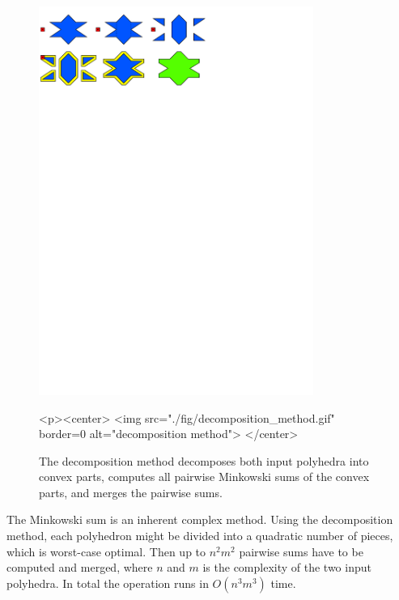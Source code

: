 \begin{figure}[t]
  \begin{ccTexOnly}
    \begin{center}
      \includegraphics[width=0.8\textwidth]{Minkowski_sum_3/fig/decomposition_method}
    \end{center}
  \end{ccTexOnly}
  \begin{ccHtmlOnly}
    <p><center>
    <img src="./fig/decomposition_method.gif" border=0 alt="decomposition method">
    </center>
  \end{ccHtmlOnly}
  \caption{The decomposition method decomposes both input polyhedra
           into convex parts, computes all pairwise Minkowski sums
           of the convex parts, and merges the pairwise sums.}
\end{figure}

The Minkowski sum is an inherent complex method. Using the
decomposition method, each polyhedron might be divided into a
quadratic number of pieces, which is worst-case optimal. Then up to
$n^2m^2$ pairwise sums have to be computed and merged, where $n$ and
$m$ is the complexity of the two input polyhedra. In total the
operation runs in $O(n^3m^3)$ time. 

